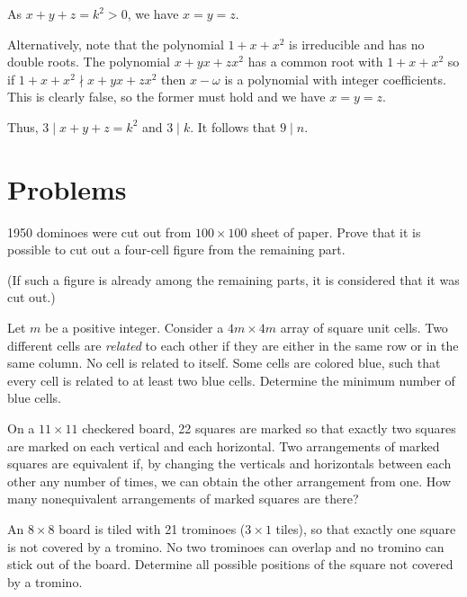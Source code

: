As $x+y+z=k^2>0$, we have $x=y=z$.

Alternatively, note that the polynomial $1+x+x^2$ is irreducible and has no double roots. The polynomial $x+yx+zx^2$ has a common root with $1+x+x^2$ so if $1+x+x^2\nmid x+yx+zx^2$ then $x-\omega$ is a polynomial with integer coefficients. This is clearly false, so the former must hold and we have $x=y=z$.

Thus, $3\mid x+y+z=k^2$ and $3\mid k$. It follows that $9\mid n$.

\section{Problems}

\begin{problem}
    1950 dominoes were cut out from $100\times 100$ sheet of paper. Prove that it is possible to cut out a four-cell figure from the remaining part.

    (If such a figure is already among the remaining parts, it is considered that it was cut out.)
\end{problem}

\begin{problem}[EGMO 2016]
    Let $m$ be a positive integer. Consider a $4m\times 4m$ array of square unit cells. Two different cells are \textit{related} to each other if they are either in the same row or in the same column. No cell is related to itself. Some cells are colored blue, such that every cell is related to at least two blue cells. Determine the minimum number of blue cells.
\end{problem}

\begin{problem}
    On a $11\times 11$ checkered board, 22 squares are marked so that exactly two squares are marked on each vertical and each horizontal. Two arrangements of marked squares are equivalent if, by changing the verticals and horizontals between each other any number of times, we can obtain the other arrangement from one. How many nonequivalent arrangements of marked squares are there?
\end{problem}

\begin{problem}
    An $8\times 8$ board is tiled with 21 trominoes ($3\times 1$ tiles), so that exactly one square is not covered by a tromino. No two trominoes can overlap and no tromino can stick out of the board. Determine all possible positions of the square not covered by a tromino.
\end{problem}


